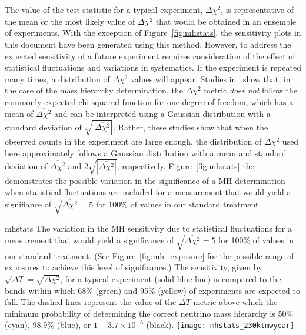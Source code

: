 The value of the test statistic for a typical experiment,  
$\overline{\Delta\chi^2}$, is
representative of the mean or the most likely value of $\Delta\chi^2$ that 
would be obtained in an ensemble of experiments.
With the exception of Figure~\ref{fig:mhstats}, the sensitivity plots
in this document have been generated using this method.
However, to address the expected sensitivity of a future experiment
requires consideration of the effect of
statistical fluctuations and variations in systematics.  If the
experiment is repeated many times, a distribution of $\Delta\chi^2$
values will appear.  Studies in~\cite{Qian:2012zn,Blennow:2013oma}
show that, in the case of the mass hierarchy
determination, the $\Delta \chi^2$ metric
{\em does not} follow the commonly expected chi-squared
function for one degree of freedom, which has a mean of
$\overline{\Delta\chi^2}$ and can be interpreted using a Gaussian
distribution with a standard deviation of
$\sqrt{|\overline{\Delta\chi^2}|}$. Rather, these studies show that
when the observed counts in the experiment are large enough,
the distribution of $\Delta\chi^2$ used here approximately follows
a Gaussian distribution with a
mean and standard deviation of $\overline{\Delta\chi^2}$ and
$2\sqrt{|\overline{\Delta\chi^2}|}$, respectively. Figure~\ref{fig:mhstats} the
demonstrates the possible variation in the significance of a MH determination when statistical
fluctuations are included for a measurement that would yield a signifiance of $\sqrt{\overline{\Delta\chi^{2}}} = 5$ for 100\% of \deltacp values in our standard treatment.

\begin{cdrfigure}{mhstats}{
  The variation in the MH sensitivity due to statistical fluctuations for a measurement that would yield a significance of $\sqrt{\overline{\Delta\chi^{2}}} = 5$ for 100\% of \deltacp values in our standard treatment. (See Figure~\ref{fig:mh_exposure} for the possible range of exposures to achieve this level of significance.)  The 
  sensitivity, given by  $\sqrt{\Delta T}=\sqrt{\Delta\chi^2}$, for a typical experiment 
  (solid blue line) is compared to the bands within which
  68\% (green) and 95\% (yellow) of experiments are expected to fall. The dashed lines
  represent the value of the $\Delta T$ metric above which the minimum
  probability of determining
  the correct neutrino mass hierarchy is 50\%(cyan), 98.9\% (blue), or $1 - 3.7\times10^{-6}$
  (black). }
 \texttt{[image: mhstats\_230ktmwyear]}
\end{cdrfigure}

